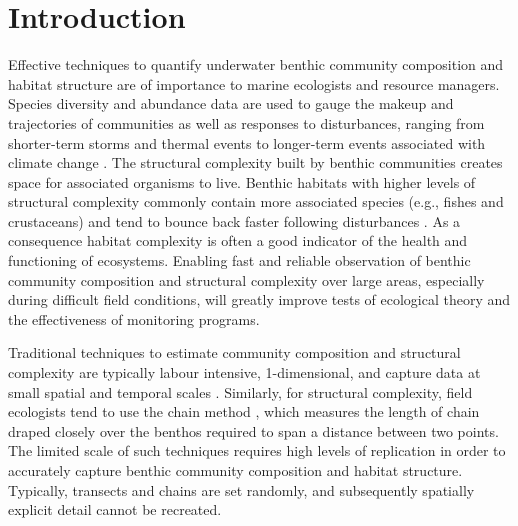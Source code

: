 \section{Introduction} 


Effective techniques to quantify underwater benthic community composition and habitat structure are of importance to marine ecologists and resource managers. Species diversity and abundance data are used to gauge the makeup and trajectories of communities as well as responses to disturbances, ranging from shorter-term storms and thermal events \cite{De_ath_2012} to longer-term events associated with climate change \cite{Hughes_2003}. The structural complexity built by benthic communities creates space for associated organisms to live. Benthic habitats with higher levels of structural complexity commonly contain more associated species (e.g., fishes and crustaceans) \cite{Graham_2012} and tend to bounce back faster following disturbances \cite{Graham_2015}.  As a consequence habitat complexity is often a good indicator of the health and functioning of ecosystems. Enabling fast and reliable observation of benthic community composition and structural complexity over large areas, especially during difficult field conditions, will greatly improve tests of ecological theory and the effectiveness of monitoring programs.

Traditional techniques to estimate community composition and structural complexity are typically labour intensive, 1-dimensional, and capture data at small spatial and temporal scales \cite{Loya_1972}. Similarly, for structural complexity, field ecologists tend to use the chain method \cite{Luckhurst_1978} \cite{Friedlander_1998}, which measures the length of chain draped closely over the benthos required to span a distance between two points. The limited scale of such techniques requires high levels of replication in order to accurately capture benthic community composition and habitat structure. Typically, transects and chains are set randomly, and subsequently spatially explicit detail cannot be recreated. 

